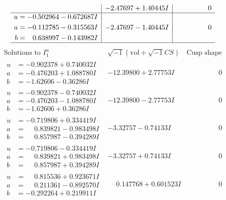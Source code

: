 \documentclass[1p]{elsarticle_modified}
\theoremstyle{definition}
\newcommand{\I}{\sqrt{-1}}
\begin{document}
$$\begin{array}{c|c|c}
 & -2.47697 + 1.40445 I & \phantom{-0.000000 } 0 \\ \hline\begin{aligned}
u &= -0.502964 - 0.672687 I \\
a &= -0.112785 - 0.315563 I \\
b &= \phantom{-}0.638997 - 0.143982 I\end{aligned}
 & -2.47697 - 1.40445 I & \phantom{-0.000000 } 0\\
 \hline 
 \end{array}$$\newpage$$\begin{array}{c|c|c}  
\text{Solutions to }I^u_{1}& \I (\text{vol} + \sqrt{-1}CS) & \text{Cusp shape}\\
 \hline 
\begin{aligned}
u &= -0.902378 + 0.740032 I \\
a &= -0.476203 + 1.088780 I \\
b &= -1.62606 - 0.36286 I\end{aligned}
 & -12.39800 + 2.77753 I & \phantom{-0.000000 } 0 \\ \hline\begin{aligned}
u &= -0.902378 - 0.740032 I \\
a &= -0.476203 - 1.088780 I \\
b &= -1.62606 + 0.36286 I\end{aligned}
 & -12.39800 - 2.77753 I & \phantom{-0.000000 } 0 \\ \hline\begin{aligned}
u &= -0.719806 + 0.334419 I \\
a &= \phantom{-}0.839821 - 0.983498 I \\
b &= \phantom{-}0.857987 - 0.394289 I\end{aligned}
 & -3.32757 - 0.74133 I & \phantom{-0.000000 } 0 \\ \hline\begin{aligned}
u &= -0.719806 - 0.334419 I \\
a &= \phantom{-}0.839821 + 0.983498 I \\
b &= \phantom{-}0.857987 + 0.394289 I\end{aligned}
 & -3.32757 + 0.74133 I & \phantom{-0.000000 } 0 \\ \hline\begin{aligned}
u &= \phantom{-}0.815536 + 0.923671 I \\
a &= \phantom{-}0.211361 - 0.892570 I \\
b &= -0.292264 + 0.219911 I\end{aligned}
 & \phantom{-}0.147768 + 0.601523 I & \phantom{-0.000000 } 0 \\ \hline\begin{aligned}

\end{aligned}
\end{array}$$
\end{document}
